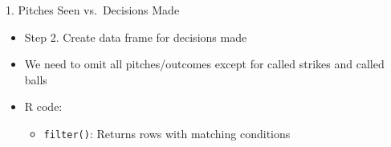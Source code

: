 \begin{frame}[fragile]{1. Pitches Seen vs.~Decisions Made}

\begin{itemize}

\item
  Step 2. Create data frame for decisions made
\item
  We need to omit all pitches/outcomes except for called strikes and
  called balls
\item
  R code:

  \begin{itemize}
  
  \item
    \texttt{filter()}: Returns rows with matching conditions
  \end{itemize}
\end{itemize}

\footnotesize

\begin{Shaded}
\end{Shaded}

\end{frame}

